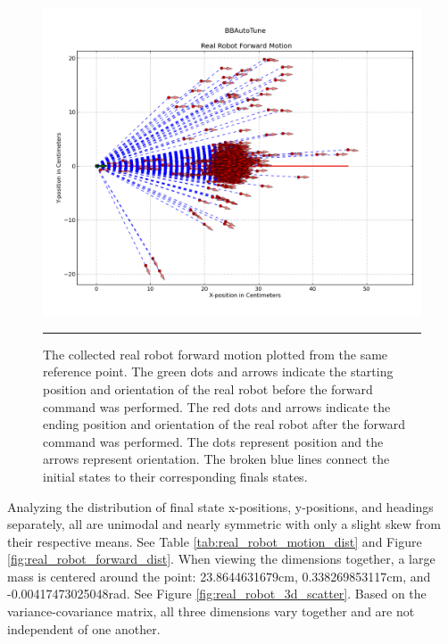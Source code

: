 \begin{figure}[htbp]
\centering
\includegraphics[scale=0.6]{../Figures/Chapter4/real_robot_forward_motion.png}
\rule{35em}{0.5pt}
\caption[Real Robot Forward Motion]{The collected real robot forward motion plotted from the same reference point. The green dots and arrows indicate the starting position and orientation of the real robot before the forward command was performed. The red dots and arrows indicate the ending position and orientation of the real robot after the forward command was performed. The dots represent position and the arrows represent orientation. The broken blue lines connect the initial states to their corresponding finals states.}
\label{fig:real_robot_forward_motion}
\end{figure}

Analyzing the distribution of final state x-positions, y-positions, and headings separately, all are unimodal and nearly symmetric with only a slight skew from their respective means. See Table \ref{tab:real_robot_motion_dist} and Figure \ref{fig:real_robot_forward_dist}. When viewing the dimensions together, a large mass is centered around the point: 23.8644631679cm, 0.338269853117cm, and -0.00417473025048rad. See Figure \ref{fig:real_robot_3d_scatter}. Based on the variance-covariance matrix, all three dimensions vary together and are not independent of one another.

